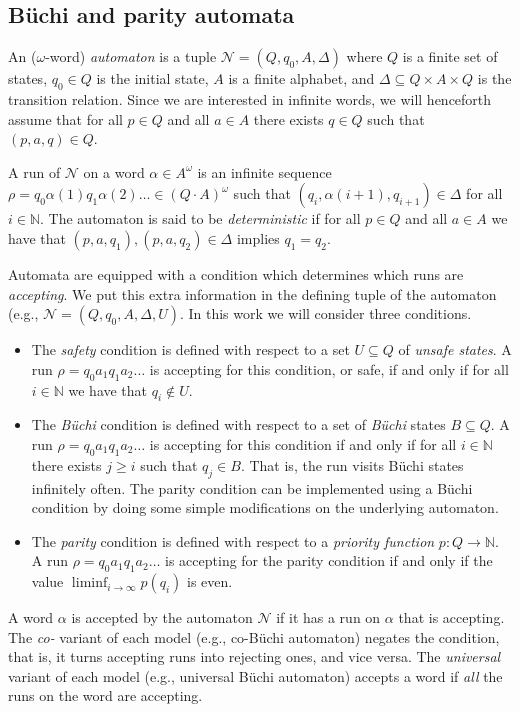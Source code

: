 \documentclass[runningheads,a4paper,draft]{llncs}
\newcommand{\calN}{\mathcal{N}}
\begin{document}
\subsection{B\"uchi and parity automata}
\begin{definition}
  An ($\omega$-word) \emph{automaton} is a tuple $\calN =
  (Q,q_0,A,\Delta)$ where $Q$ is a finite set of states, $q_0 \in Q$ is the
  initial state, $A$ is a finite alphabet, and $\Delta \subseteq Q \times A
  \times Q$ is the transition relation. Since we are interested in infinite
  words, we will henceforth assume that for all $p \in Q$ and all $a \in A$
  there exists $q \in Q$ such that $(p,a,q) \in Q$.
\end{definition}
A run of $\calN$ on a word $\alpha \in A^\omega$ is an infinite sequence $\rho =
q_0 \alpha(1) q_1 \alpha(2) \dots \in (Q\cdot A)^\omega$ such that
$(q_i,\alpha(i+1),q_{i+1}) \in \Delta$ for all $i \in \mathbb{N}$. The automaton
is said to be \emph{deterministic} if for all $p \in Q$ and all $a \in A$ we
have that $(p,a,q_1), (p,a,q_2) \in \Delta$ implies $q_1 = q_2$.

Automata are equipped with a condition which determines which runs are
\emph{accepting}.  We put this extra information in the defining tuple of the
automaton (e.g., \(\calN = (Q, q_0, A, \Delta, U)\).  In this work we will
consider three conditions.
\begin{itemize}
  \item The \emph{safety} condition is defined with respect to a set $U
    \subseteq Q$ of \emph{unsafe states}. A run $\rho = q_0 a_1 q_1 a_2 \dots$
    is accepting for this condition, or safe, if and only if for all $i \in
    \mathbb{N}$ we have that $q_i \not\in U$.
  \item The \emph{B\"uchi} condition is defined with respect to a set of
    \emph{B\"uchi} states $B \subseteq Q$. A run $\rho = q_0
    a_1 q_1 a_2 \dots$ is accepting for this condition if and only if for
    all $i \in \mathbb{N}$ there exists $j \ge i$ such that $q_j \in B$.
    That is, the run visits B\"uchi states infinitely often.  The parity
    condition can be implemented using a Büchi condition by doing some simple
    modifications on the underlying automaton.
  \item The \emph{parity} condition is defined with respect to a
    \emph{priority function} $p\colon Q \to \mathbb{N}$. A run $\rho = q_0 a_1
    q_1 a_2 \dots$ is accepting for the parity condition if and only if the
    value $\liminf_{i \to \infty} p(q_i)$ is even.
\end{itemize}
A word $\alpha$ is accepted by the automaton $\calN$ if it has a run on $\alpha$
that is accepting.  The \emph{co-} variant of each model (e.g., co-Büchi
automaton) negates the condition, that is, it turns accepting runs into
rejecting ones, and vice versa.  The \emph{universal} variant
of each model (e.g., universal Büchi automaton) accepts a word if \emph{all} the
runs on the word are accepting.
\end{document}
